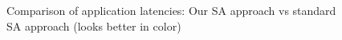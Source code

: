 \begin{figure}[h!]
{    \label{fig:jacl1random}
  }
  \caption{Comparison of application latencies: Our SA approach vs
    standard SA approach (looks better in color)}
  \label{fig:stdsa}
\end{figure}



